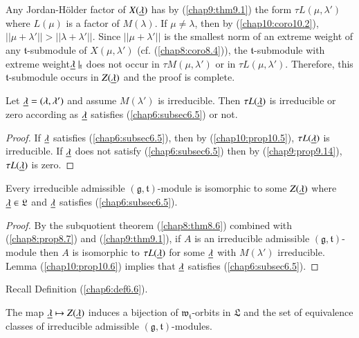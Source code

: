 Any Jordan-H\"older factor of $X(\underline{\lambda})$ has by (\ref{chap9:thm9.1}) the form
$\tau L (\mu, \lambda')$ where $L(\mu)$ is a factor of
$M(\lambda)$. If $\mu \neq \lambda$, then by (\ref{chap10:coro10.2}), $||\mu +
\lambda'|| > ||\lambda + \lambda'||$. Since $||\mu + \lambda'||$ is
the smallest norm of an extreme weight of any $\mathfrak{t}$-submodule
of $X(\mu, \lambda')$ (cf. (\ref{chap8:coro8.4})), the $\mathfrak{t}$-submodule with
extreme weight\pageoriginale $\underline{\lambda} \mid_\mathfrak{t}$ does not
occur in $\tau M (\mu, \lambda')$ or in $\tau L(\mu,
\lambda')$. Therefore, this $\mathfrak{t}$-submodule occurs in
$Z(\underline{\lambda})$ and the proof is complete. 

\begin{prop}\label{chap10:prop10.6}
Let $\underline{\lambda} = (\lambda, \lambda')$ and assume $M(\lambda')$ is
irreducible. Then $\tau L(\underline{\lambda})$ is irreducible or zero
according as $\underline{\lambda}$ satisfies (\ref{chap6:subsec6.5}) or not. 
\end{prop}

\begin{proof}
If $\underline{\lambda}$ satisfies (\ref{chap6:subsec6.5}), then by
(\ref{chap10:prop10.5}), $\tau 
L(\underline{\lambda})$ is irreducible. If $\underline{\lambda}$ does not satisfy
(\ref{chap6:subsec6.5}) then by (\ref{chap9:prop9.14}), $\tau
L(\underline{\lambda})$ is zero.  
\end{proof}

\begin{prop}\label{chap10:prop10.7}
Every irreducible admissible $(\mathfrak{g}, \mathfrak{t})$-module is
isomorphic to some $Z(\underline{\lambda})$ where $\underline{\lambda} \in
\mathfrak{L}$ and $\underline{\lambda}$ satisfies (\ref{chap6:subsec6.5}). 
\end{prop}

\begin{proof}
By the subquotient theorem (\ref{chap8:thm8.6}) combined with
(\ref{chap8:prop8.7}) and (\ref{chap9:thm9.1}), if $A$ 
is an irreducible admissible $(\mathfrak{g}, \mathfrak{t})$-module
then $A$ is isomorphic to $\tau L(\underline{\lambda})$ for some $\underline{\lambda}$
with $M(\lambda')$ irreducible. Lemma (\ref{chap10:prop10.6}) implies that
$\underline{\lambda}$ satisfies (\ref{chap6:subsec6.5}). 
\end{proof}

Recall Definition (\ref{chap6:def6.6}). 

\begin{theorem}\label{chap10:thm10.8}
The map $\underline{\lambda} \mapsto Z(\underline{\lambda})$ induces a bijection of
$\mathfrak{w}_\mathfrak{t}$-orbits in $\mathfrak{L}$ and the set of
equivalence classes of irreducible admissible $(\mathfrak{g},
\mathfrak{t})$-modules. 
\end{theorem}

